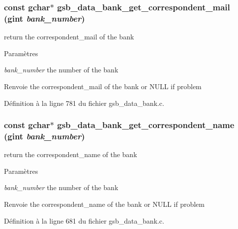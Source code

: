 \subsubsection[{gsb\_\-data\_\-bank\_\-get\_\-correspondent\_\-mail}]{\setlength{\rightskip}{0pt plus 5cm}const gchar$\ast$ gsb\_\-data\_\-bank\_\-get\_\-correspondent\_\-mail (gint {\em bank\_\-number})}\label{gsb__data__bank_8h_ab46d3251ade8383b98be516cc99a5bbe}
return the correspondent\_\-mail of the bank


\begin{DoxyParams}{Paramètres}
\item[{\em bank\_\-number}]the number of the bank\end{DoxyParams}
\begin{DoxyReturn}{Renvoie}
the correspondent\_\-mail of the bank or NULL if problem 
\end{DoxyReturn}


Définition à la ligne 781 du fichier gsb\_\-data\_\-bank.c.

\subsubsection[{gsb\_\-data\_\-bank\_\-get\_\-correspondent\_\-name}]{\setlength{\rightskip}{0pt plus 5cm}const gchar$\ast$ gsb\_\-data\_\-bank\_\-get\_\-correspondent\_\-name (gint {\em bank\_\-number})}\label{gsb__data__bank_8h_a22dc4c253cd27be2af29bf4be274aec0}
return the correspondent\_\-name of the bank


\begin{DoxyParams}{Paramètres}
\item[{\em bank\_\-number}]the number of the bank\end{DoxyParams}
\begin{DoxyReturn}{Renvoie}
the correspondent\_\-name of the bank or NULL if problem 
\end{DoxyReturn}


Définition à la ligne 681 du fichier gsb\_\-data\_\-bank.c.


